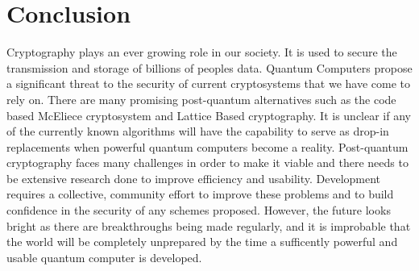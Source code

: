 \documentclass[journal]{IEEEtran}
\begin{document}
%






\section{Conclusion}
Cryptography plays an ever growing role in our society. It is used to secure the transmission and storage of billions of peoples data. Quantum Computers
propose a significant threat to the security of current cryptosystems that we have come to rely on. There are many promising post-quantum alternatives such as the code based
McEliece cryptosystem and Lattice Based cryptography. It is unclear if any of the currently known algorithms will have the capability to serve as drop-in replacements when powerful quantum computers
become a reality. Post-quantum cryptography faces many challenges in order to make it viable and there needs to be extensive research done to improve efficiency and usability. Development requires a collective, community effort to improve these problems
and to build confidence in the security of any schemes proposed. However, the future looks bright as there are breakthroughs being made regularly, and it is improbable that the world will be completely unprepared by the time a sufficently powerful and usable quantum
computer is developed.
\end{document}
